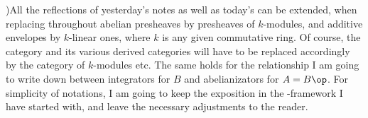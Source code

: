 )\enspace All the reflections of yesterday's
notes as well as today's can be extended, when replacing throughout
abelian presheaves by presheaves of $k$-modules, and
additive envelopes by $k$-linear ones, where $k$ is any given
commutative ring. Of course, the category \Ab{} and its various
derived categories will have to be replaced accordingly by the
category \kMod{} of $k$-modules etc. The same holds for the
relationship I am going to write down between integrators for $B$ and
abelianizators for $A=B\op$. For simplicity of notations, I am going
to keep the exposition in the \Ab-framework I have started with, and
leave the necessary adjustments to the reader.

\bigbreak
\presectionfill{}\par

